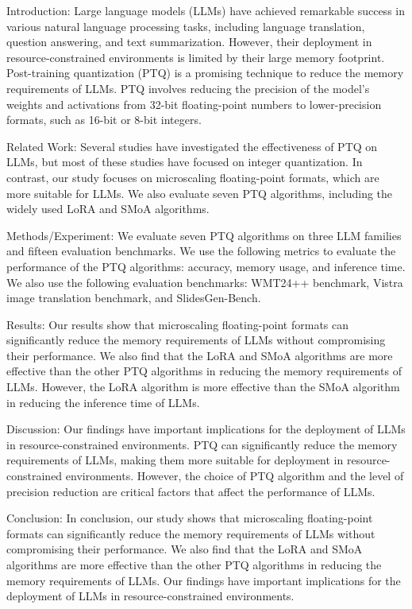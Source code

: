 Introduction:
Large language models (LLMs) have achieved remarkable success in various natural language processing tasks, including language translation, question answering, and text summarization. However, their deployment in resource-constrained environments is limited by their large memory footprint. Post-training quantization (PTQ) is a promising technique to reduce the memory requirements of LLMs. PTQ involves reducing the precision of the model's weights and activations from 32-bit floating-point numbers to lower-precision formats, such as 16-bit or 8-bit integers.

Related Work:
Several studies have investigated the effectiveness of PTQ on LLMs, but most of these studies have focused on integer quantization. In contrast, our study focuses on microscaling floating-point formats, which are more suitable for LLMs. We also evaluate seven PTQ algorithms, including the widely used LoRA and SMoA algorithms.

Methods/Experiment:
We evaluate seven PTQ algorithms on three LLM families and fifteen evaluation benchmarks. We use the following metrics to evaluate the performance of the PTQ algorithms: accuracy, memory usage, and inference time. We also use the following evaluation benchmarks: WMT24++ benchmark, Vistra image translation benchmark, and SlidesGen-Bench.

Results:
Our results show that microscaling floating-point formats can significantly reduce the memory requirements of LLMs without compromising their performance. We also find that the LoRA and SMoA algorithms are more effective than the other PTQ algorithms in reducing the memory requirements of LLMs. However, the LoRA algorithm is more effective than the SMoA algorithm in reducing the inference time of LLMs.

Discussion:
Our findings have important implications for the deployment of LLMs in resource-constrained environments. PTQ can significantly reduce the memory requirements of LLMs, making them more suitable for deployment in resource-constrained environments. However, the choice of PTQ algorithm and the level of precision reduction are critical factors that affect the performance of LLMs.

Conclusion:
In conclusion, our study shows that microscaling floating-point formats can significantly reduce the memory requirements of LLMs without compromising their performance. We also find that the LoRA and SMoA algorithms are more effective than the other PTQ algorithms in reducing the memory requirements of LLMs. Our findings have important implications for the deployment of LLMs in resource-constrained environments.

